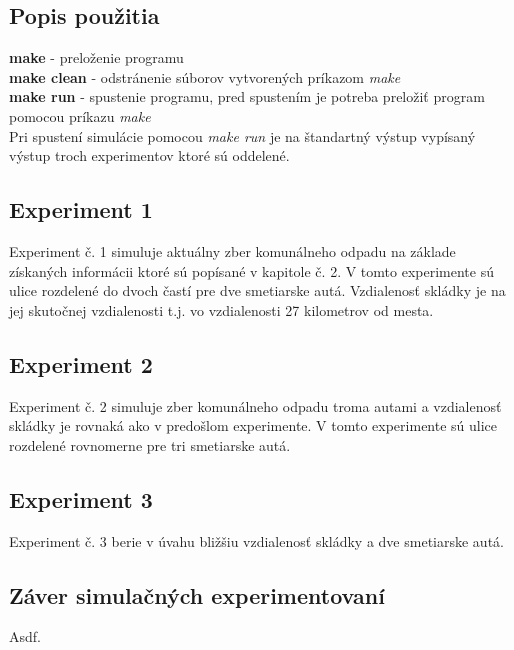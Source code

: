 \documentclass[11pt,a4paper]{article}
\begin{document}
    \subsection{Popis použitia}

        \noindent \textbf{make} - preloženie programu\\[0.4em]
        \noindent \textbf{make clean} - odstránenie súborov vytvorených príkazom \textit{make}\\[0.4em]
        \noindent \textbf{make run} - spustenie programu, pred spustením je potreba preložiť program pomocou príkazu \textit{make}\\

        \noindent Pri spustení simulácie pomocou \textit{make run} je na štandartný výstup vypísaný výstup troch experimentov ktoré sú oddelené.

    \subsection{Experiment 1}

        Experiment č. 1 simuluje aktuálny zber komunálneho odpadu na základe získaných informácii ktoré sú popísané v kapitole č. 2. V tomto experimente sú ulice rozdelené do dvoch častí pre dve smetiarske autá. Vzdialenosť skládky je na jej skutočnej vzdialenosti t.j. vo vzdialenosti 27 kilometrov od mesta.


    \subsection{Experiment 2}

        Experiment č. 2 simuluje zber komunálneho odpadu troma autami a vzdialenosť skládky je rovnaká ako v predošlom experimente. V tomto experimente sú ulice rozdelené rovnomerne pre tri smetiarske autá.

    \subsection{Experiment 3}

        Experiment č. 3 berie v úvahu bližšiu vzdialenosť skládky a dve smetiarske autá.

    \subsection{Záver simulačných experimentovaní}

        Asdf.
\end{document}
